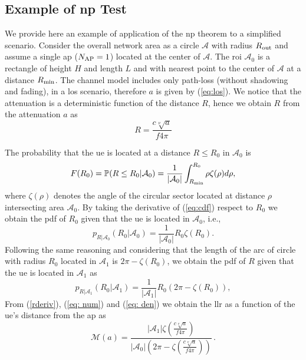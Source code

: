 \documentclass[draftcls,onecolumn,12pt]{IEEEtran}
\begin{document}
\subsection{Example of \ac{np} Test}\label{sec:los}

We provide here an example of application of the \ac{np} theorem to a simplified scenario. Consider the overall network area as a circle $\mathcal{A}$ with radius $R_{\rm out}$ and assume a single \ac{ap} ($N_{\rm AP} =1$) located at the center of $\mathcal{A}$. The \ac{roi} $\mathcal{A}_{0}$ is a rectangle of height $H$ and length $L$ and with nearest point to the center of $\mathcal{A}$ at a distance $R_{\rm min}$. The channel model includes only path-loss (without shadowing and fading), in a \ac{los} scenario, therefore $a$ is given by (\ref{eq:los}). We notice that the attenuation is a deterministic function of the distance $R$, hence we obtain $R$ from the attenuation $a$ as 
\begin{equation}
\label{rderiv}
    R = \frac{c\sqrt[\nu]a}{f 4 \pi}
\end{equation}

 The probability that the \ac{ue} is located at a distance $R\le R_0$ in $\mathcal{A}_0$ is
\begin{equation}\label{eq:cdf}
     F(R_0) = \mathbb{P}(R \le R_0|\mathcal{A}_0) = \frac{1}{|\mathcal{A}_0|}\int_{R_{\rm min}}^{R_0} \rho  \zeta(\rho ) d\rho ,
\end{equation}
where $\zeta(\rho )$ denotes the angle of the circular sector located at distance $\rho$ intersecting area $\mathcal{A}_0$. By taking the derivative of (\ref{eq:cdf}) respect to $R_0$ we obtain the \ac{pdf} of $R_0$ given that the \ac{ue} is located in $\mathcal{A}_0$, i.e.,
\begin{equation}\label{eq: num}
    p_{R|\mathcal{A}_0}(R_0 |\mathcal{A}_0) = \frac{1}{|\mathcal{A}_0|}R_0 \zeta(R_0).
\end{equation}
Following the same reasoning and considering that the length of the arc of circle with radius $R_0$ located in $\mathcal{A}_1$ is $2\pi - \zeta(R_0)$, we obtain the \ac{pdf} of  $R$ given that the \ac{ue} is located in $\mathcal{A}_1$ as
\begin{equation}\label{eq: den}
     p_{R|\mathcal{A}_1}(R_0 |\mathcal{A}_1) = \frac{1}{|\mathcal{A}_1|}R_0 \left(2\pi-\zeta(R_0)\right),
\end{equation}
From (\ref{rderiv}), (\ref{eq: num}) and (\ref{eq: den}) we obtain the \ac{llr} as a function of the \ac{ue}'s distance from the \ac{ap} as
\begin{equation}
    \mathcal{M}(a) = \frac{|\mathcal{A}_1|\zeta\left(\frac{c\sqrt[\nu]a}{f 4 \pi}\right)}{|\mathcal{A}_0|\left(2\pi-\zeta\left(\frac{c\sqrt[\nu]a}{f 4 \pi}\right)\right)}\,.
\end{equation}
\end{document}

